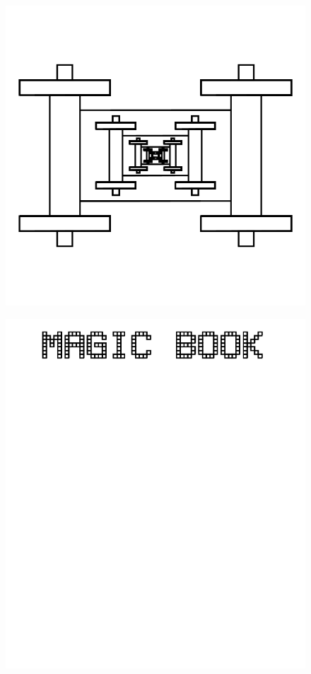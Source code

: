 \documentclass[17pt]{extreport}
\begin{document}
	\begin{figure}
		\centering
		\includegraphics[width=7.75in]{imageserver/uploadimages/image17.png}
	\end{figure}
	\begin{figure}
		\centering
		\includegraphics[width=6.25in]{imageserver/uploadimages/magicbook.png}
	\end{figure}
\end{document}
